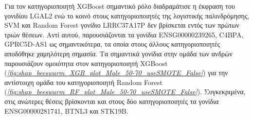 \documentclass[12pt]{report}
\begin{document}
        \par
            Για τον κατηγοριοποιητή XGBoost σημαντικό ρόλο διαδραμάτισε η έκφραση του γονιδίου LGAL2 ενώ το κοινό στους κατηγοριοποιητές της λογιστικής παλινδρόμησης, SVM και Random Forest γονίδιο LRRC37A17P δεν βρίσκεται εντός των πρώτων τριών θέσεων. Αντί αυτού, παρουσιάζονται τα γονίδια ENSG00000239265, C4BPA, GPRC5D-AS1 ως σημαντικότερα, τα οποία στους άλλους κατηγοριοποιητές αποδόθηκε χαμηλότερη σημασία. Τα σημαντικά γονίδια στην ομάδα των ανδρών παρουσιάζουν ομοιότητα στον κατηγοριοποιητή XGBoost (\emph{\ref{fig:shap_beeswarm_XGB_plot_Male_50-70_useSMOTE_False}}) για την αντίστοιχη ομάδα του κατηγοριοποιητή Random Forest (\emph{\ref{fig:shap_beeswarm_RF_plot_Male_50-70_useSMOTE_False}}). Συγκεκριμένα, στις ανώτερες θέσεις βρίσκονται και στους δύο κατηγοριοποιητές τα γονίδια ENSG00000281741, BTNL3 και STK19B.
\end{document}
